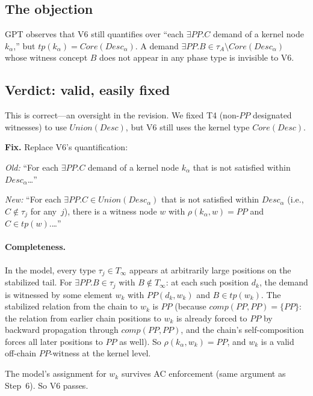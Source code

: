 \documentclass[11pt]{article}
\newcommand{\PP}{\mathit{PP}}
\newcommand{\comp}{\mathit{comp}}
\newcommand{\tp}{\mathit{tp}}
\newcommand{\Desc}{\mathit{Desc}}
\newcommand{\Core}{\mathit{Core}}
\newcommand{\Union}{\mathit{Union}}
\theoremstyle{definition}
\begin{document}
\subsection{The objection}

GPT observes that V6 still quantifies over ``each $\exists\PP.C$
demand of a kernel node $k_\alpha$,'' but
$\tp(k_\alpha) = \Core(\Desc_\alpha)$.  A demand
$\exists\PP.B \in \tau_A \setminus \Core(\Desc_\alpha)$ whose
witness concept $B$ does not appear in any phase type is
invisible to V6.

\subsection{Verdict: valid, easily fixed}

This is correct---an oversight in the revision.  We fixed T4
(non-$\PP$ designated witnesses) to use $\Union(\Desc)$, but
V6 still uses the kernel type $\Core(\Desc)$.

\medskip\noindent\textbf{Fix.}\; Replace V6's quantification:

\smallskip
\noindent\emph{Old:}\; ``For each $\exists\PP.C$ demand of a
kernel node $k_\alpha$ that is not satisfied within
$\Desc_\alpha$\ldots''

\smallskip
\noindent\emph{New:}\; ``For each $\exists\PP.C \in
\Union(\Desc_\alpha)$ that is not satisfied within
$\Desc_\alpha$ (i.e., $C \notin \tau_j$ for any~$j$),
there is a witness node $w$ with $\rho(k_\alpha, w) = \PP$ and
$C \in \tp(w)$.\ldots''

\paragraph{Completeness.}
In the model, every type $\tau_j \in T_\infty$ appears at
arbitrarily large positions on the stabilized tail.  For
$\exists\PP.B \in \tau_j$ with $B \notin T_\infty$: at each
such position $d_k$, the demand is witnessed by some element
$w_k$ with $\PP(d_k, w_k)$ and $B \in \tp(w_k)$.  The
stabilized relation from the chain to $w_k$ is $\PP$ (because
$\comp(\PP, \PP) = \{\PP\}$: the relation from earlier chain
positions to $w_k$ is already forced to $\PP$ by backward
propagation through $\comp(\PP, \PP)$, and the chain's
self-composition forces all later positions to $\PP$ as well).
So $\rho(k_\alpha, w_k) = \PP$, and $w_k$ is a valid off-chain
$\PP$-witness at the kernel level.

The model's assignment for $w_k$ survives AC enforcement (same
argument as Step~6).  So V6 passes.
\end{document}
